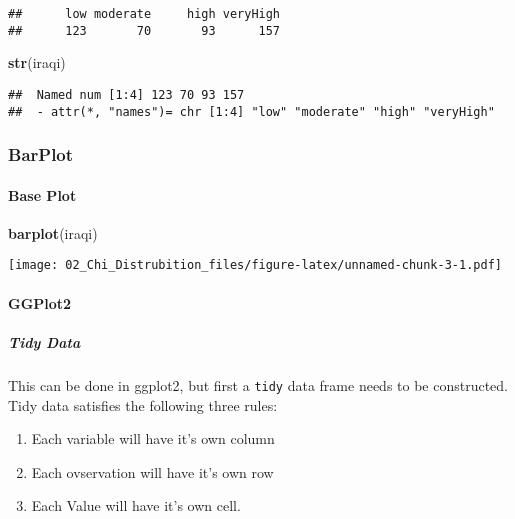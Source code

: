 \documentclass[
]{article}
\newenvironment{Shaded}{\begin{snugshade}}{\end{snugshade}}
\newcommand{\KeywordTok}[1]{\textcolor[rgb]{0.13,0.29,0.53}{\textbf{#1}}}
\newcommand{\NormalTok}[1]{#1}
\providecommand{\tightlist}{%
  \setlength{\itemsep}{0pt}\setlength{\parskip}{0pt}}
\begin{document}
\begin{verbatim}
##      low moderate     high veryHigh 
##      123       70       93      157
\end{verbatim}

\begin{Shaded}
\begin{Highlighting}[]
\KeywordTok{str}\NormalTok{(iraqi)}
\end{Highlighting}
\end{Shaded}

\begin{verbatim}
##  Named num [1:4] 123 70 93 157
##  - attr(*, "names")= chr [1:4] "low" "moderate" "high" "veryHigh"
\end{verbatim}

\hypertarget{barplot}{%
\subsubsection{BarPlot}\label{barplot}}

\hypertarget{base-plot}{%
\paragraph{Base Plot}\label{base-plot}}

\begin{Shaded}
\begin{Highlighting}[]
\KeywordTok{barplot}\NormalTok{(iraqi)}
\end{Highlighting}
\end{Shaded}

\texttt{[image: 02\_Chi\_Distrubition\_files/figure-latex/unnamed-chunk-3-1.pdf]}

\hypertarget{ggplot2}{%
\paragraph{GGPlot2}\label{ggplot2}}

\hypertarget{tidy-data}{%
\subparagraph{Tidy Data}\label{tidy-data}}

This can be done in ggplot2, but first a \texttt{tidy} data frame needs
to be constructed. Tidy data satisfies the following three rules:

\begin{enumerate}
\def\labelenumi{\arabic{enumi}.}
\tightlist
\item
  Each variable will have it's own column
\item
  Each ovservation will have it's own row
\item
  Each Value will have it's own cell.
\end{enumerate}
\end{document}
